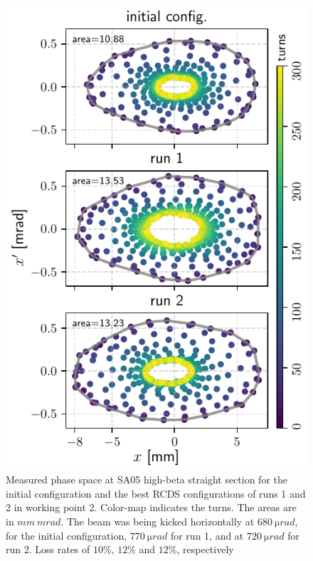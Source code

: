 \documentclass[a4paper,
               keeplastbox,   %
               ]{jacow}
\begin{document}
\begin{figure}
   \includegraphics[width=\columnwidth]{WEPL087_f4.pdf}
   \caption{Measured phase space at SA05 high-beta straight section for the initial configuration and the best RCDS configurations of runs 1 and 2 in working point 2. Color-map indicates the turns. The areas are in $\unit{mm}~\unit{mrad}$. The beam was being kicked horizontally at $680~\unit{\micro rad}$, for the initial configuration, $770~\unit{\micro rad}$ for run 1, and at $720~\unit{\micro rad}$ for run 2. Loss rates of $10\%$, $12\%$ and $12\%$, respectively}
   \label{fig:newtunes_phase}
\end{figure}
\end{document}
